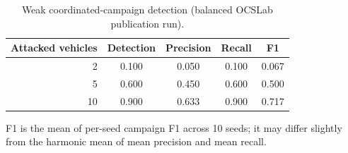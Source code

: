 \begin{table}[t]
\centering
\caption{Weak coordinated-campaign detection (balanced OCSLab publication run).}
\label{tab:verified_weak_campaign_detection}
\begin{tabular}{@{}rcccc@{}}
\toprule
Attacked vehicles & Detection & Precision & Recall & F1 \\
\midrule
2 & 0.100 & 0.050 & 0.100 & 0.067 \\
5 & 0.600 & 0.450 & 0.600 & 0.500 \\
10 & 0.900 & 0.633 & 0.900 & 0.717 \\
\bottomrule
\end{tabular}
\begin{flushleft}
\footnotesize F1 is the mean of per-seed campaign F1 across 10 seeds; it may differ slightly from the harmonic mean of mean precision and mean recall.
\end{flushleft}
\end{table}
